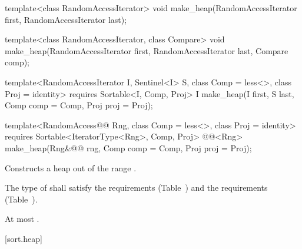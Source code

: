 %
\begin{removedblock}
\begin{itemdecl}
template<class RandomAccessIterator>
  void make_heap(RandomAccessIterator first, RandomAccessIterator last);

template<class RandomAccessIterator, class Compare>
  void make_heap(RandomAccessIterator first, RandomAccessIterator last,
                 Compare comp);
\end{itemdecl}
\end{removedblock}
\begin{addedblock}
\begin{itemdecl}
template<RandomAccessIterator I, Sentinel<I> S, class Comp = less<>,
    class Proj = identity>
  requires Sortable<I, Comp, Proj>
  I make_heap(I first, S last, Comp comp = Comp{}, Proj proj = Proj{});

template<RandomAccess@@ Rng, class Comp = less<>, class Proj = identity>
  requires Sortable<IteratorType<Rng>, Comp, Proj>
  @@<Rng>
    make_heap(Rng&@\newtxt{\&}@ rng, Comp comp = Comp{}, Proj proj = Proj{});
\end{itemdecl}
\end{addedblock}

\begin{itemdescr}
\pnum
\effects
Constructs a heap out of the range
.

\begin{removedblock}
\pnum
\requires The type of  shall satisfy
the  requirements
(Table~) and the
 requirements
(Table~).
\end{removedblock}

\begin{addedblock}
\pnum
\returns {}
\end{addedblock}

\pnum
\complexity
At most
.
\end{itemdescr}

[sort.heap]{}

